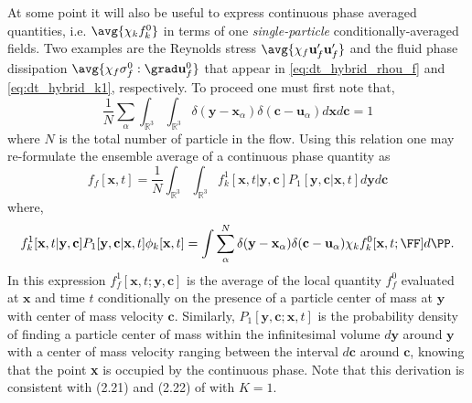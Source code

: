 At some point it will also be useful to express continuous phase averaged quantities, i.e. $\avg{\chi_k f_k^0}$  in terms of one  \textit{single-particle} conditionally-averaged fields. 
Two examples are the Reynolds stress $\avg{\chi_f \textbf{u}_f'\textbf{u}_f'}$ and the fluid phase dissipation $\avg{\chi_f\sigma_f^0:\grad \textbf{u}_f^0}$ that appear in \ref{eq:dt_hybrid_rhou_f} and \ref{eq:dt_hybrid_k1}, respectively.  
To proceed one must first note that, 
\begin{equation}
    \frac{1}{N}\sum_\alpha 
    \int_{\mathbb{R}^3}
    \int_{\mathbb{R}^3}
    \delta(\textbf{y}-\textbf{x}_\alpha)
    \delta(\textbf{c}-\textbf{u}_\alpha)
    d\textbf{x}
    d\textbf{c}
    = 1
\end{equation}
where $N$ is the total number of particle in the flow. 
Using this relation one may re-formulate the ensemble average of a continuous phase quantity as 
\begin{equation}
    f_f[\textbf{x},t]
    = 
    \frac{1}{N}
    \int_{\mathbb{R}^3}
    \int_{\mathbb{R}^3}
    f_k^1[\textbf{x},t|\textbf{y},\textbf{c}]  P_1[\textbf{y},\textbf{c}|\textbf{x},t] 
    d\textbf{y} 
    d\textbf{c}
    \label{eq:conditional_averaged_fluid}
\end{equation}
where,
\begin{equation*}
    f_k^1[\textbf{x},t|\textbf{y},\textbf{c}] P_1[\textbf{y},\textbf{c}|\textbf{x},t] \phi_k[\textbf{x},t]
    =     
    \int
    \sum_\alpha^N 
    \delta(\textbf{y}-\textbf{x}_\alpha)
     \delta(\textbf{c}-\textbf{u}_\alpha)
    \chi_k
    f^0_k[\textbf{x},t;\FF]
    d\PP.
\end{equation*}
In this expression $f_f^1[\textbf{x},t;\textbf{y},\textbf{c}]$ is the average of the local quantity $f_f^0$ evaluated at $\textbf{x}$ and time $t$ conditionally on the presence of a particle center of mass at $\textbf{y}$ with center of mass velocity $\textbf{c}$. 
Similarly, $P_1[\textbf{y},\textbf{c};\textbf{x},t]$ is the probability density of finding a particle center of mass within the infinitesimal volume $d\textbf{y}$ around $\textbf{y}$ with a center of mass velocity ranging between the interval $d\textbf{c}$ around $\textbf{c}$, knowing that the point \textbf{x} is occupied by the continuous phase. 
Note that this derivation is consistent with (2.21) and (2.22) of \citet{zhang1994ensemble} with $K = 1$. 


